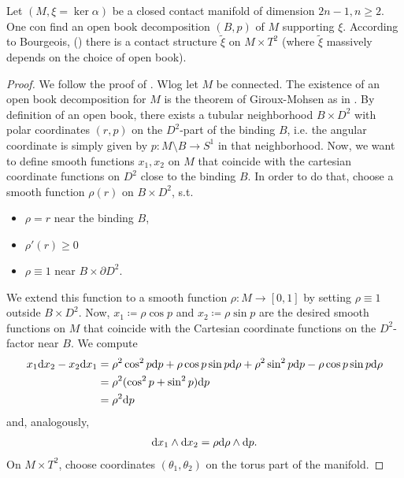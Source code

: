 \begin{theorem}\label{thm:bourgeois}
    Let $(M, \xi = \ker \alpha )$ be a closed contact manifold of dimension $2n - 1, n \geq 2$. One con find an open book decomposition $(B,p)$ of $M$ supporting $\xi$. According to Bourgeois, (\cite{Bourgeois02}) there is a contact structure $\tilde{\xi}$ on $M \times T^2$ (where $\tilde \xi$ massively depends on the choice of open book).
\end{theorem}
\begin{proof}
    We follow the proof of \cite[Thm 7.3.6]{Geiges08}.
    Wlog let $M$ be connected.
    The existence of an open book decomposition for $M$ is the theorem of Giroux-Mohsen as in \cite[Thm 7.3.5]{Geiges08}.
    By definition of an open book, there exists a tubular neighborhood $B \times D^2$ with polar coordinates $(r, p)$ on the $D^2$-part of the binding $B$, i.e. the angular coordinate is simply given by $p: M \setminus B \to S^1$ in that neighborhood.
    Now, we want to define smooth functions $x_1, x_2$ on $M$ that coincide with the cartesian coordinate functions on $D^2$ close to the binding $B$. In order to do that, choose a smooth function $\rho(r)$ on $B \times D^2$, s.t. 
    \begin{itemize}
        \item $\rho = r$ near the binding $B$,
        \item $\rho'(r) \geq 0$
        \item $\rho \equiv 1$ near $B \times \partial D^2$.
    \end{itemize}
    We extend this function to a smooth function $\rho: M \to [0,1]$
    by setting $\rho \equiv 1$ outside $B\times D^2$.
    Now, $x_1 \coloneqq \rho \cos p$ and $x_2 \coloneqq \rho \sin p$ are the desired smooth functions on $M$ that coincide with the Cartesian coordinate functions on the $D^2$-factor near $B$.
    We compute
    \begin{align*}
        x_1 \mathrm{d} x_2 - x_2 \mathrm{d} x_1 &= \rho^2 \cos^2 p \mathrm{d} p + \rho \cos p \sin p \mathrm{d} \rho + \rho^2 \sin^2 p \mathrm{d} p - \rho \cos p \sin p \mathrm{d} \rho\\
        &= \rho^2 (\cos^2 p + \sin^2 p) \mathrm{d} p\\
        &= \rho^2 \mathrm{d} p
    \end{align*}
    and, analogously,
    \begin{align*}
        \mathrm{d} x_1 \wedge \mathrm{d} x_2 = \rho \mathrm{d} \rho \wedge \mathrm{d} p.
    \end{align*}
    On $M\times T^2$, choose coordinates $(\theta_1, \theta_2)$ on the torus part of the manifold.

\end{proof}

